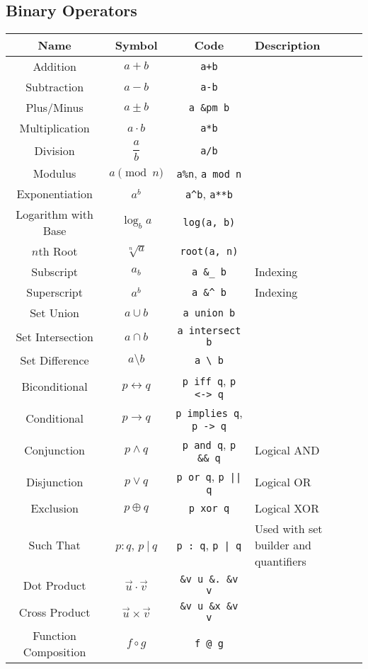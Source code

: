 \documentclass{article}
\begin{document}
  \subsection{Binary Operators} %
  \label{sub:binary_ops}
  \begin{table}[!h]
    \centering
    \begin{tabular}{|c|c|c|l|}
      \hline
      \textbf{Name} & \textbf{Symbol} & \textbf{Code} & \textbf{Description} \\
      \hline\hline
      
      Addition & \( a + b \) & \texttt{a+b} & \\
      Subtraction & \( a - b \) & \texttt{a-b} & \\
      Plus/Minus & \( a \pm b \) & \texttt{a \&pm b} & \\
      Multiplication & \( a \cdot b \) & \texttt{a*b} & \\
      Division & \( \dfrac{a}{b} \) & \texttt{a/b} & \\
      Modulus & \( a \pmod{n} \) & \texttt{a\%n}, \texttt{a mod n} & \\
      Exponentiation & \( a^b \) & \texttt{a\^{}b}, \texttt{a**b} & \\
      Logarithm with Base & \( \log_b{a} \) & \texttt{log(a, b)} & \\
      \( n \)th Root & \( \sqrt[n]{a} \) & \texttt{root(a, n)} & \\
      Subscript & \( a_b \) & \texttt{a \&\_ b} & Indexing \\
      Superscript & \( a^b \) & \texttt{a \&\^{} b} & Indexing \\
      Set Union & \( a \cup b \) & \texttt{a union b} & \\
      Set Intersection & \( a \cap b \) & \texttt{a intersect b} & \\
      Set Difference & \( a \setminus b \) & \texttt{a \textbackslash \ b} & \\
      Biconditional & \( p \longleftrightarrow q \) & \texttt{p iff q}, \texttt{p <-> q} & \\
      Conditional & \( p \rightarrow q \) & \texttt{p implies q}, \texttt{p -> q} & \\
      Conjunction & \( p \wedge q \) & \texttt{p and q}, \texttt{p \&\& q} & Logical AND \\
      Disjunction & \( p \vee q \) & \texttt{p or q}, \texttt{p || q} & Logical OR \\
      Exclusion & \( p \oplus q \) & \texttt{p xor q} & Logical XOR \\
      Such That & \( p : q \), \( p ~|~ q \) & \texttt{p : \!\!q}, \texttt{p | q} & Used with set builder and quantifiers \\
      Dot Product & \( \vec{u} \cdot \vec{v} \) & \texttt{\&v u \&. \&v v} & \\
      Cross Product & \( \vec{u} \times \vec{v} \) & \texttt{\&v u \&x \&v v} & \\
      Function Composition & \( f \circ g \) & \texttt{f @ g} & \\
      \hline
    \end{tabular}
  \end{table}
  
\end{document}
